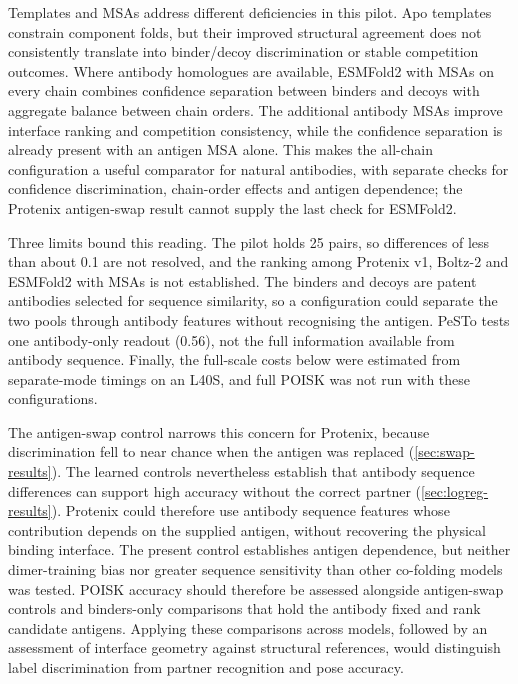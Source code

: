 \documentclass[11pt,a4paper]{article}
\begin{document}
Templates and MSAs address different deficiencies in this pilot.
Apo templates constrain component folds, but their improved structural agreement does not consistently translate into binder/decoy discrimination or stable competition outcomes.
Where antibody homologues are available, ESMFold2 with MSAs on every chain combines confidence separation between binders and decoys with aggregate balance between chain orders.
The additional antibody MSAs improve interface ranking and competition consistency, while the confidence separation is already present with an antigen MSA alone.
This makes the all-chain configuration a useful comparator for natural antibodies, with separate checks for confidence discrimination, chain-order effects and antigen dependence; the Protenix antigen-swap result cannot supply the last check for ESMFold2.

Three limits bound this reading.
The pilot holds 25 pairs, so differences of less than about 0.1 are not resolved, and the ranking among Protenix v1, Boltz-2 and ESMFold2 with MSAs is not established.
The binders and decoys are patent antibodies selected for sequence similarity, so a configuration could separate the two pools through antibody features without recognising the antigen. PeSTo tests one antibody-only readout (0.56), not the full information available from antibody sequence.
Finally, the full-scale costs below were estimated from separate-mode timings on an L40S, and full POISK was not run with these configurations.

The antigen-swap control narrows this concern for Protenix, because discrimination fell to near chance when the antigen was replaced (\cref{sec:swap-results}).
The learned controls nevertheless establish that antibody sequence differences can support high accuracy without the correct partner (\cref{sec:logreg-results}).
Protenix could therefore use antibody sequence features whose contribution depends on the supplied antigen, without recovering the physical binding interface.
The present control establishes antigen dependence, but neither dimer-training bias nor greater sequence sensitivity than other co-folding models was tested.
POISK accuracy should therefore be assessed alongside antigen-swap controls and binders-only comparisons that hold the antibody fixed and rank candidate antigens.
Applying these comparisons across models, followed by an assessment of interface geometry against structural references, would distinguish label discrimination from partner recognition and pose accuracy.
\end{document}
